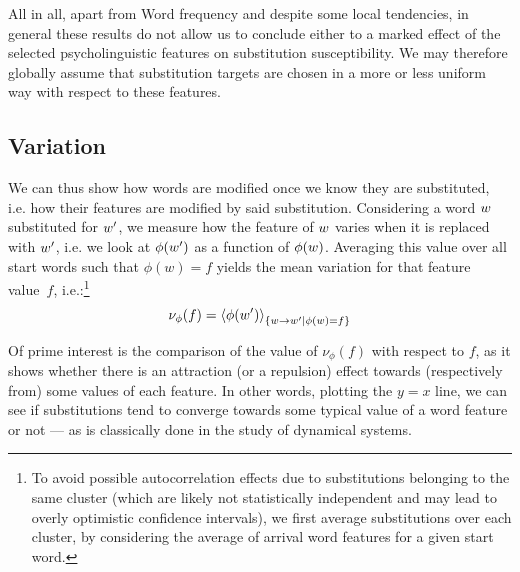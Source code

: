 All in all, apart from Word frequency and despite some local tendencies, {in general} these results do not allow us to conclude either to a marked effect %
of the selected psycholinguistic features on substitution susceptibility.
We may therefore globally assume that substitution targets are chosen in a more or less uniform way with respect to these features.


\subsection{Variation}

We can thus show how words are modified once we know they are substituted, \hbox{i.e.} how their features are modified by said substitution.
Considering a word $w$ substituted for $w'$, we measure how the feature of $w$ varies when it is replaced with $w'$, i.e. we look at $\phi(w')$ as a function of $\phi(w)$. 
Averaging this value over all start words such that $\phi(w) = f$ yields the mean variation for that feature value~$f$, i.e.:\footnote{To avoid possible autocorrelation effects due to substitutions belonging to the same cluster (which are likely not statistically independent and may lead to overly optimistic confidence intervals), we first average substitutions over each cluster, by considering the average of arrival word features for a given start word.}
$$\nu_{\phi}(f) = \left<\phi(w')\right>_{\left\lbrace w\rightarrow w' | \phi(w) = f \right\rbrace}$$

Of prime interest is the comparison of the value of $\nu_{\phi}(f)$ with respect to $f$, as it shows whether there is an attraction (or a repulsion) effect towards (respectively from) some values of each feature.
In other words, plotting the $y=x$ line, we can see if substitutions tend to converge towards some typical value of a word feature or not --- as is classically done in the study of dynamical systems.


